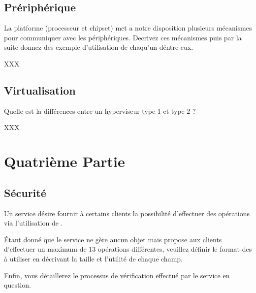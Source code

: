 \subsection{Pr\'eriph\'erique
            }

La platforme (processeur et chipset) met a notre disposition plusieurs
m\'ecanismes pour communiquer avec les p\'eriph\'eriques. Decrivez ces
m\'ecanismes puis par la suite donnez des exemple d'utilisation de
chaqu'un d\'entre eux.

\begin{correction}

XXX

\end{correction}

\subsection{Virtualisation
            }

Quelle est la diff\'erences entre un hyperviseur type 1 et type 2 ?

\begin{correction}

XXX

\end{correction}

%
%

\section{Quatri\`eme Partie
         }

%
%
\subsection{S\'ecurit\'e
            }

Un service d\'esire fournir \`a certains clients la possibilit\'e
d'effectuer des op\'erations via l'utilisation de .

\'Etant donn\'e que le service ne g\`ere aucun objet mais propose
aux clients d'effectuer un maximum de $13$ op\'erations diff\'erentes,
veuillez d\'efinir le format des  \`a utiliser en
d\'ecrivant la taille et l'utilit\'e de chaque champ.

Enfin, vous d\'etaillerez le processus de v\'erification effectu\'e
par le service en question.

